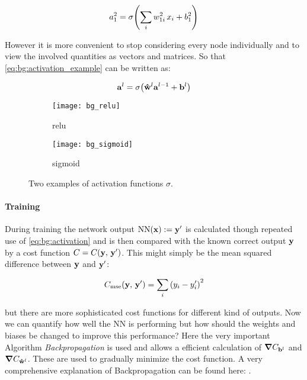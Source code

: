 \begin{equation} \label{eq:bg:activation_example}
    a^2_1 = \sigma \qty(\sum_i w^2_{1i} \, x_i + b^2_1)
\end{equation}

\noindent
However it is more convenient to stop considering every node individually and to view the involved quantities as vectors and matrices. So that \eqref{eq:bg:activation_example} can be written as:

\begin{equation} \label{eq:bg:activation}
    \vb{a}^l = \sigma \qty(\vu{w}^l \vb{a}^{l-1} + \vb{b}^l)
\end{equation}

\begin{figure}[H]
\centering
\begin{subfigure}{.5\textwidth}
    \centering
    \texttt{[image: bg\_relu]}
    \caption{relu}
    \label{}
\end{subfigure}%
\begin{subfigure}{.5\textwidth}
    \centering
    \texttt{[image: bg\_sigmoid]}
    \caption{sigmoid}
    \label{}
\end{subfigure}
\caption{Two examples of activation functions $\sigma$.}
\label{}
\end{figure}

\paragraph{Training}
During training the network output $\mathrm{NN}(\vb x) := \vb{y}' $ is calculated though repeated use of \eqref{eq:bg:activation} and is then compared with the known correct output $\vb y$ by a cost function $C = C(\vb y, \, \vb y')$. This might simply be the mean squared difference between $\vb y$ and $\vb y'$:

\begin{equation}
    C_{\mathrm{mse}}(\vb y, \, \vb y') = \sum_i \qty(y_i - y_i')^2
\end{equation}

\noindent
but there are more sophisticated cost functions for different kind of outputs. Now we can quantify how well the NN is performing but how should the weights and biases be changed to improve this performance?
Here the very important Algorithm \textit{Backpropagation} is used and allows a efficient calculation of $\grad{C}_{\vb{b}^l}$ and $\grad{C}_{\vu{w}^l}$. These are used to gradually minimize the cost function. A very comprehensive explanation of Backpropagation can be found here: \cite{backprop}.

